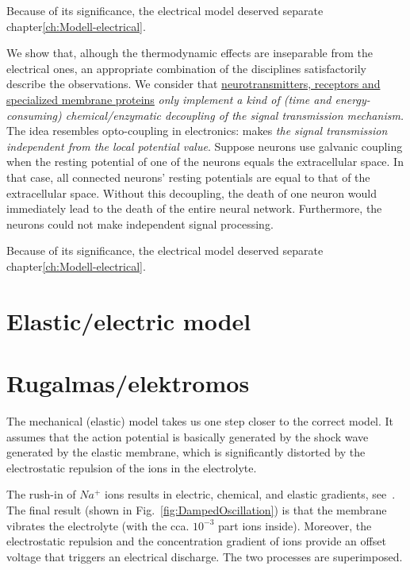 Because of its significance, the electrical model deserved separate chapter\ref{ch:Modell-electrical}.

\else

We show that, alhough the thermodynamic effects
are inseparable from the electrical ones, an appropriate combination of the disciplines satisfactorily describe the observations.
We consider that \href{https://neuronaldynamics.epfl.ch/online/Ch1.S1.html}{neurotransmitters, receptors and specialized membrane proteins}
\textit{only implement a kind of (time and energy-consuming)
	chemical/enzymatic decoupling
	of the signal transmission mechanism.} The idea resembles opto-coupling in electronics:
makes \textit{the signal transmission independent from the local potential value}.
Suppose neurons use galvanic coupling
when the resting potential of one of the neurons equals the extracellular space. In that case,
all connected neurons' resting potentials are
equal to that of the extracellular space. Without this decoupling, the death
of one neuron would immediately lead to the death of the entire neural network.
Furthermore, the neurons could not make independent signal processing.

Because of its significance, the electrical model deserved separate chapter\ref{ch:Modell-electrical}.

\fi


\ifx\magyar\undefined

\section[Elastic model]{Elastic/electric model\label{sec:V2-0_ElasticModel}}
\else
\section[Rugalmas modell]{Rugalmas/elektromos\label{sec:V2-0_ElasticModel}}

\fi

\ifx\magyar\undefined
The mechanical (elastic) model takes us one step closer to the correct model. It assumes that the action potential is basically generated by the shock wave generated by the elastic membrane, which is significantly distorted by the electrostatic repulsion of the ions in the electrolyte.

The rush-in of $Na^+$ ions results in electric, chemical, and elastic gradients, see~\cite{VeghUnifiedCrossdisciplinaryModel:2026}. The final result (shown in Fig.~\ref{fig:DampedOscillation}) is that the membrane vibrates the 
electrolyte (with the cca. $10^{-3}$ part ions inside).
Moreover, the electrostatic repulsion and the concentration gradient of ions provide an offset voltage that triggers an electrical discharge. 
The two processes are superimposed.


